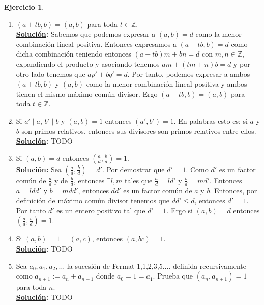 \documentclass[11pt,letterpaper]{article}
\theoremstyle{definition}\newtheorem{p}{Ejercicio}
\theoremstyle{definition}\newtheorem{pp}[p]{$(*)$Ejercicio}
\numberwithin{p}{section}
\newcommand{\Z}{\mathbb{Z}}
\newcommand{\sol}{\textbf{\underline{Solución}: }} %
\begin{document}
\begin{p}
\begin{enumerate}
  \item $(a+tb,b)=(a,b)$ para toda $t\in\Z$.\\
  \sol Sabemos que podemos expresar a $(a,b)=d$ como la menor combinación lineal positiva. Entonces 
  expresamos a  $(a+tb,b)=d$ como dicha combinación teniendo entonces $(a+tb)m + bn = d$ con $m,n \in \Z$, 
  expandiendo el producto y asociando tenemos $am + (tm+n)b = d$ y por otro lado tenemos que 
  $ap' + bq' = d$. Por tanto, podemos expresar a ambos $(a+tb,b)$ y $(a,b)$ como la menor combinación lineal 
  positiva y ambos tienen el mismo máximo común divisor. Ergo $(a+tb,b)=(a,b)$ para toda $t \in\Z$.
  
  \item Si $a'\mid a$, $b'\mid b$ y $(a,b)=1$ entonces $(a',b')=1$. En palabras esto es: si $a$ y $b$ son 
  primos relativos, entonces sus divisores son primos relativos entre ellos.\\
  \sol TODO

  \item Si $(a,b)=d$ entonces $\left( \frac{a}{d}, \frac{b}{d} \right)=1$. \\
  \sol Sea $\left( \frac{a}{d}, \frac{b}{d} \right)=d'$. Por demostrar que $d'=1$. Como $d'$ es un factor 
  común de $\frac{a}{d}$ y de $\frac{b}{d}$, entonces $\exists l, m$ tales que $\frac{a}{d} = ld'$ y 
  $\frac{b}{d} = md'$. Entonces $a = ldd'$ y $b = m dd'$, entonces $dd'$ es un factor común de $a$ y $b$. 
  Entonces, por definición de máximo común divisor tenemos que $dd' \leq d$, entonces $d' = 1$. 
  Por tanto $d'$ es un entero positivo tal que $d'=1$. Ergo si  $(a, b) = d$ entonces  
  $\left( \frac{a}{d}, \frac{b}{d} \right)=1$.
  
  \item Si $(a,b)=1=(a,c)$, entonces $(a,bc)=1$.\\
  \sol TODO
  
  \item  Sea $a_0,a_1,a_2,\ldots$ la sucesi\'on de Fermat 1,1,2,3,5.$\ldots$ definida recursivamente como 
  $a_{n+1}:=a_n+a_{n-1}$ donde $a_0=1=a_1$. Prueba que $(a_n,a_{n+1})=1$ para toda $n$.\\
  \sol TODO
  
  \end{enumerate}
\end{p}
%
\end{document}
